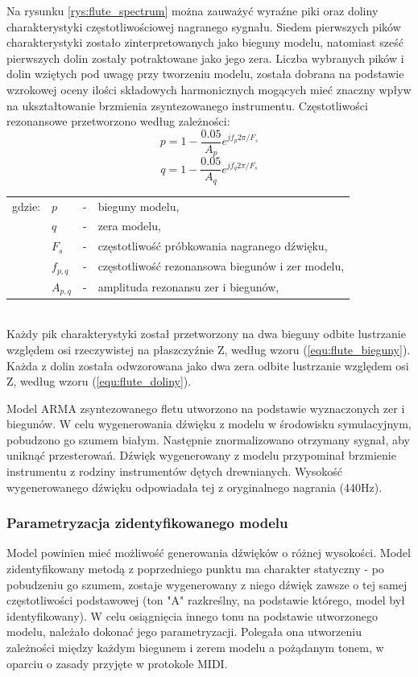Na rysunku \ref{rys:flute_spectrum} można zauważyć wyraźne piki oraz doliny charakterystyki częstotliwościowej nagranego sygnału. Siedem pierwszych pików charakterystyki zostało zinterpretowanych jako bieguny modelu, natomiast sześć pierwszych dolin zostały potraktowane jako jego zera. Liczba wybranych pików i dolin wziętych pod uwagę przy tworzeniu modelu, została dobrana na podstawie wzrokowej oceny ilości składowych harmonicznych mogących mieć znaczny wpływ na ukształtowanie brzmienia zsyntezowanego instrumentu. Częstotliwości rezonansowe przetworzono według zależności:
\begin{equation} \label{equ:flute_bieguny}
p = 1-\frac{0.05}{A_{p}}e^{jf_{p}2\pi/F_{s}}
\end{equation}
\begin{equation} \label{equ:flute_doliny}
q = 1-\frac{0.05}{A_{q}}e^{jf_{q}2\pi/F_{s}}
\end{equation}
\begin{tabular}{ l l l l}
	gdzie: & $p$ &  - & bieguny modelu, \\
	&	$q$ & - &  zera modelu, \\
	&	$F_{s}$ & - &  częstotliwość próbkowania nagranego dźwięku,\\
	&	$f_{p,q}$ & - &  częstotliwość rezonansowa biegunów i zer modelu, \\
	&	$A_{p,q}$ & - &  amplituda rezonansu zer i biegunów, \\
\end{tabular} \\

Każdy pik charakterystyki został przetworzony na dwa bieguny odbite lustrzanie względem osi rzeczywistej na płaszczyźnie Z, według wzoru (\ref{equ:flute_bieguny}). Każda z dolin została odwzorowana jako dwa zera odbite lustrzanie względem osi Z, według wzoru (\ref{equ:flute_doliny}).

Model ARMA zsyntezowanego fletu utworzono na podstawie wyznaczonych zer i biegunów. W celu wygenerowania dźwięku z modelu w środowisku symulacyjnym, pobudzono go szumem białym. Następnie znormalizowano otrzymany sygnał, aby uniknąć przesterowań. Dźwięk wygenerowany z modelu przypominał brzmienie instrumentu z rodziny instrumentów dętych drewnianych. Wysokość wygenerowanego dźwięku odpowiadała tej z oryginalnego nagrania (440Hz).

\subsubsection{Parametryzacja zidentyfikowanego modelu}
Model powinien mieć możliwość generowania dźwięków o różnej wysokości. Model zidentyfikowany metodą z poprzedniego punktu ma charakter statyczny - po pobudzeniu go szumem, zostaje wygenerowany z niego dźwięk zawsze o tej samej częstotliwości podstawowej (ton "A" razkreślny, na podstawie którego, model był identyfikowany). W celu osiągnięcia innego tonu na podstawie utworzonego modelu, należało dokonać jego parametryzacji. Polegała ona utworzeniu zależności między każdym biegunem i zerem modelu a pożądanym tonem, w oparciu o zasady przyjęte w protokole MIDI.

